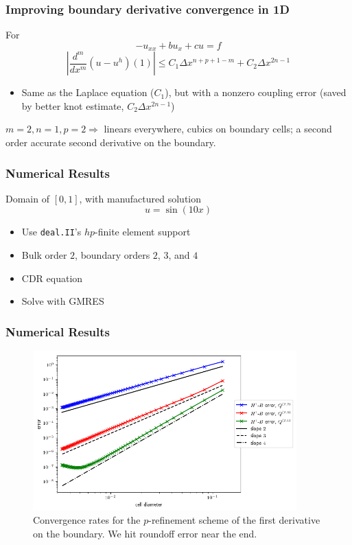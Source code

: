 \documentclass[8pt]{beamer}
\begin{document}
\begin{frame}
    \frametitle{Improving boundary derivative convergence in 1D}
    For
    \begin{equation*}
        -u_{xx} + b u_x + c u = f
    \end{equation*}
    \pause
    \begin{equation*}
        \left|\dfrac{d^m}{dx^m}(u - u^h)(1)\right|
        \leq C_1 \Delta x^{n + p + 1 - m}
        + C_2 \Delta x^{2 n - 1}
    \end{equation*}
    \pause
    \begin{itemize}
        \item Same as the Laplace equation (\(C_1\)), but with a nonzero coupling error
              (saved by better knot estimate, \(C_2 \Delta x^{2 n - 1}\))
    \end{itemize}
    \pause
    \begin{center}
        \(m = 2, n = 1, p = 2 \Rightarrow\) linears everywhere, cubics on
        boundary cells; a second order accurate second derivative on the
        boundary.
    \end{center}
\end{frame}

\begin{frame}
    \frametitle{Numerical Results}
    Domain of \([0, 1]\), with manufactured solution
    \begin{equation*}
        u = \sin(10 x)
    \end{equation*}
    \begin{itemize}
        \item Use \texttt{deal.II}'s \(hp\)-finite element support
        \item Bulk order \(2\), boundary orders \(2\), \(3\), and \(4\)
        \item CDR equation
        \item Solve with GMRES
    \end{itemize}
\end{frame}

\begin{frame}
    \frametitle{Numerical Results}
    \begin{figure}
        \centering
        \includegraphics[width=4in]{Pictures/oned-cdr-2-h1-errors.png}

        \caption{Convergence rates for the \(p\)-refinement scheme of the
        first derivative on the boundary. We hit roundoff error near the end.}
    \end{figure}
\end{frame}
\end{document}
